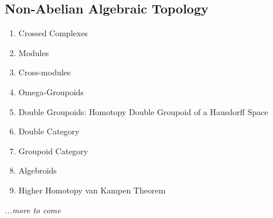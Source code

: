 \documentclass[12pt]{article}
\theoremstyle{plain}
\theoremstyle{definition}
\numberwithin{equation}{section}
\begin{document}
\subsection{Non-Abelian Algebraic Topology}
\begin{enumerate}

\item Crossed Complexes
\item Modules
\item Cross-modules
\item Omega-Groupoids
\item Double Groupoids: Homotopy Double Groupoid of a Hausdorff Space
\item Double Category
\item Groupoid Category
\item Algebroids
\item Higher Homotopy van Kampen Theorem

\end{enumerate}

\emph{...more to come}
\end{document}
